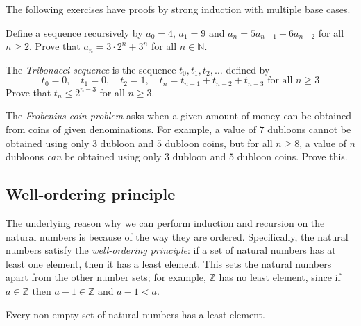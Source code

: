 The following exercises have proofs by strong induction with multiple base cases.

\begin{exercise}
Define a sequence recursively by $a_0 = 4$, $a_1 = 9$ and $a_n = 5a_{n-1} - 6a_{n-2}$ for all $n \ge 2$. Prove that $a_n = 3 \cdot 2^n + 3^n$ for all $n \in \mathbb{N}$.
\end{exercise}

\begin{exercise}
The \textit{Tribonacci sequence} is the sequence $t_0, t_1, t_2, \dots$ defined by
\[ t_0 = 0, \quad t_1 = 0, \quad t_2 = 1, \quad t_n = t_{n-1} + t_{n-2} + t_{n-3} \text{ for all } n \ge 3 \]
Prove that $t_n \le 2^{n-3}$ for all $n \ge 3$.
\end{exercise}

\begin{exercise}
The \textit{Frobenius coin problem} asks when a given amount of money can be obtained from coins of given denominations. For example, a value of $7$ dubloons cannot be obtained using only $3$ dubloon and $5$ dubloon coins, but for all $n \ge 8$, a value of $n$ dubloons \textit{can} be obtained using only $3$ dubloon and $5$ dubloon coins. Prove this.
\end{exercise}

\subsection*{Well-ordering principle}

The underlying reason why we can perform induction and recursion on the natural numbers is because of the way they are ordered. Specifically, the natural numbers satisfy the \textit{well-ordering principle}: if a set of natural numbers has at least one element, then it has a least element. This sets the natural numbers apart from the other number sets; for example, $\mathbb{Z}$ has no least element, since if $a \in \mathbb{Z}$ then $a-1 \in \mathbb{Z}$ and $a-1 < a$.

\begin{theorem}
\label{thmWellOrderingPrinciple}
Every non-empty set of natural numbers has a least element.
\end{theorem}


